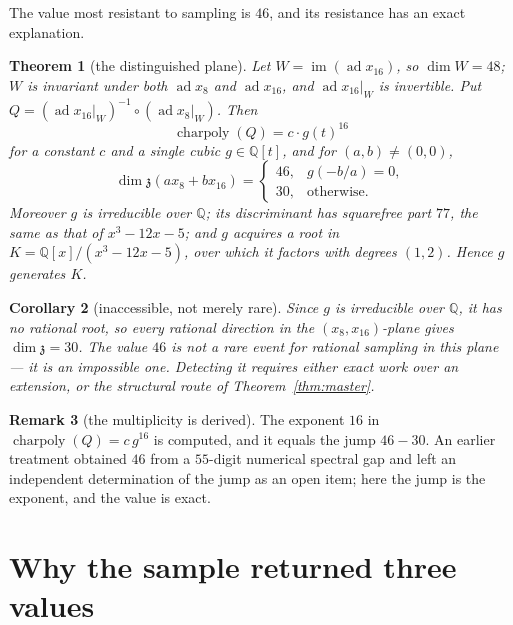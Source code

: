 \documentclass[11pt,a4paper]{article}
\newtheorem{theorem}{Theorem}[section]
\newtheorem{corollary}[theorem]{Corollary}
\theoremstyle{definition}
\newtheorem{remark}[theorem]{Remark}
\theoremstyle{remark}
\newcommand{\z}{\mathfrak{z}}
\newcommand{\Q}{\mathbb{Q}}
\newcommand{\ad}{\operatorname{ad}}
\newcommand{\im}{\operatorname{im}}
\newcommand{\charpoly}{\operatorname{charpoly}}
\begin{document}
The value most resistant to sampling is $46$, and its resistance has an exact explanation.

\begin{theorem}[the distinguished plane]\label{thm:46}
Let $W=\im(\ad x_{16})$, so $\dim W=48$; $W$ is invariant under both $\ad x_8$ and $\ad x_{16}$,
and $\ad x_{16}|_W$ is invertible. Put $Q=(\ad x_{16}|_W)^{-1}\circ(\ad x_8|_W)$. Then
\[
   \charpoly(Q)=c\cdot g(t)^{16}
\]
for a constant $c$ and a single cubic $g\in\Q[t]$, and for $(a,b)\ne(0,0)$,
\[
   \dim\z(a x_8+b x_{16})=
   \begin{cases}
      46, & g(-b/a)=0,\\
      30, & \text{otherwise.}
   \end{cases}
\]
Moreover $g$ is irreducible over $\Q$; its discriminant has squarefree part $77$, the same as
that of $x^3-12x-5$; and $g$ acquires a root in $K=\Q[x]/(x^3-12x-5)$, over which it factors
with degrees $(1,2)$. Hence $g$ generates $K$.
\end{theorem}

\begin{corollary}[inaccessible, not merely rare]\label{cor:inaccessible}
Since $g$ is irreducible over $\Q$, it has no rational root, so \emph{every} rational direction
in the $(x_8,x_{16})$-plane gives $\dim\z=30$. The value $46$ is not a rare event for rational
sampling in this plane --- it is an impossible one. Detecting it requires either exact work over
an extension, or the structural route of Theorem~\ref{thm:master}.
\end{corollary}

\begin{remark}[the multiplicity is derived]
The exponent $16$ in $\charpoly(Q)=c\,g^{16}$ is computed, and it equals the jump $46-30$. An
earlier treatment obtained $46$ from a $55$-digit numerical spectral gap and left an independent
determination of the jump as an open item; here the jump is the exponent, and the value is
exact.
\end{remark}

\section{Why the sample returned three values}\label{sec:sampling}
\end{document}
